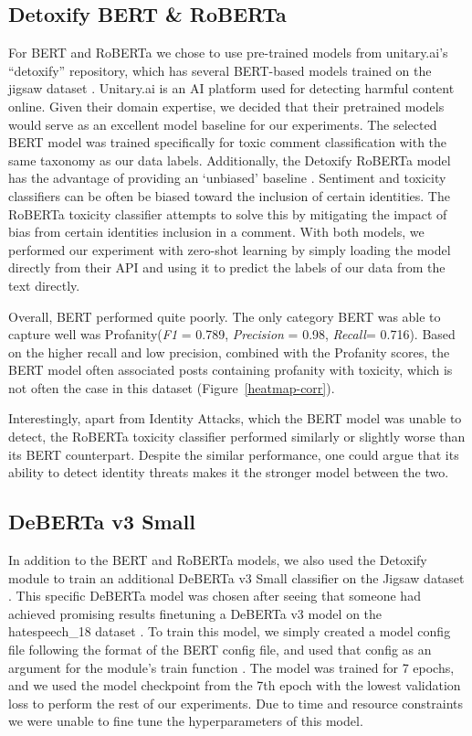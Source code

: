 \documentclass[11pt]{article}
\begin{document}
\subsection{Detoxify BERT \& RoBERTa}
For BERT and RoBERTa we chose to use pre-trained models from unitary.ai’s  “detoxify” repository, which has several BERT-based models trained on the jigsaw dataset \citep{Detoxif, kaggle}.  Unitary.ai is an AI platform used for detecting harmful content online.  Given their domain expertise, we decided that their pretrained models would serve as an excellent model baseline for our experiments.  The selected BERT model was trained specifically for toxic comment classification with the same taxonomy as our data labels. Additionally, the Detoxify RoBERTa model has the advantage of providing an ‘unbiased’ baseline \citep{Detoxify}. Sentiment and toxicity classifiers can be often be biased toward the inclusion of certain identities.  The RoBERTa toxicity classifier attempts to solve this by mitigating the impact of bias from certain identities inclusion in a comment. With both models, we performed our experiment with zero-shot learning by simply loading the model directly from their API and using it to predict the labels of our data from the text directly.

Overall,  BERT performed quite poorly.  The only category BERT was able to capture well was Profanity(\emph{F1} = 0.789, \emph{Precision} =  0.98, \emph{Recall}= 0.716). Based on the higher recall and low precision, combined with the Profanity scores, the BERT model often associated posts containing profanity with toxicity, which is not often the case in this dataset (Figure~\ref{heatmap-corr}).

Interestingly, apart from Identity Attacks, which the BERT model was unable to detect, the RoBERTa toxicity classifier performed similarly or slightly worse than its BERT counterpart.  Despite the similar performance, one could argue that its ability to detect identity threats makes it the stronger model between the two.


\subsection{DeBERTa v3 Small}
In addition to the BERT and RoBERTa models, we also used the Detoxify module to train an additional DeBERTa v3 Small classifier on the Jigsaw dataset  \citep{he2021debertav3}.  This specific DeBERTa model was chosen after seeing that someone had achieved promising results finetuning a DeBERTa v3 model on the hatespeech\_18 dataset \citep{gibert2018hate, narrativa}.  To train this model, we simply created a model config file following the format of the BERT config file, and used that config as an argument for the module’s train function \citep{Detoxify}.  The model was trained for 7 epochs, and we used the model checkpoint from the 7th epoch with the lowest validation loss to perform the rest of our experiments.  Due to time and resource constraints we were unable to fine tune the hyperparameters of this model.
\end{document}
